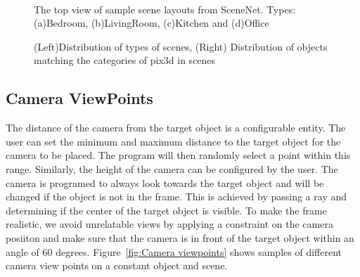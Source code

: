 \begin{figure}[!ht]
    \centering
    \quad
    \\
    \quad
    \caption{The top view of sample scene layouts from SceneNet. Types: (a)Bedroom, (b)LivingRoom, (c)Kitchen and (d)Office}
    \label{fig:Scene Types}
\end{figure}


\begin{figure}[!ht]
    \resizebox{0.49\textwidth}{6cm}{}
    \resizebox{0.49\textwidth}{6cm}{}
    \caption{(Left)Distribution of types of scenes, (Right) Distribution of objects matching the categories of pix3d in scenes}
    \label{fig:distribution of scenes}
\end{figure}


\subsection{Camera ViewPoints}\label{subsec:camera-viewpoints}

The distance of the camera from the target object is a configurable entity.
The user can set the minimum and maximum distance to the target object for the camera to be placed.
The program will then randomly select a point within this range.
Similarly, the height of the camera can be configured by the user.
The camera is programed to always look towards the target object and will be changed if the object is not in the frame.
This is achieved by passing a ray and determining if the center of the target object is visible.
To make the frame realistic, we avoid unrelatable views by applying a constraint on the camera posiiton and make sure that the camera is in front of the target object within an angle of 60 degrees.
Figure~\ref{fig:Camera viewpoints} shows samples of different camera view points on a constant object and scene.

